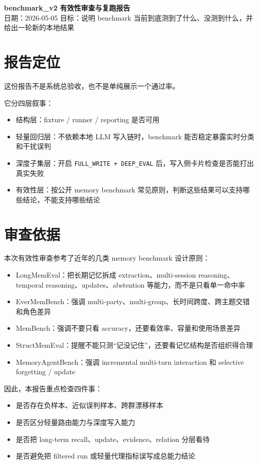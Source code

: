 \documentclass[11pt]{article}
\begin{document}
{\LARGE\bfseries benchmark\_v2 有效性审查与复跑报告}\\
{\small \color{textgray} 日期：2026-05-05 \quad 目标：说明 benchmark 当前到底测到了什么、没测到什么，并给出一轮新的本地结果}

\section{报告定位}

这份报告不是系统总验收，也不是单纯展示一个通过率。

它分四层叙事：
\begin{itemize}
\item 结构层：fixture / runner / reporting 是否可用
\item 轻量回归层：不依赖本地 LLM 写入链时，benchmark 能否稳定暴露实时分类和干扰误判
\item 深度子集层：开启 \texttt{FULL\_WRITE + DEEP\_EVAL} 后，写入侧卡片检查是否能打出真实失败
\item 有效性层：按公开 memory benchmark 常见原则，判断这些结果可以支持哪些结论，不能支持哪些结论
\end{itemize}

\section{审查依据}

本次有效性审查参考了近年的几类 memory benchmark 设计原则：
\begin{itemize}
\item LongMemEval：把长期记忆拆成 extraction、multi-session reasoning、temporal reasoning、updates、abstention 等能力，而不是只看单一命中率
\item EverMemBench：强调 multi-party、multi-group、长时间跨度、跨主题交错和角色差异
\item MemBench：强调不要只看 accuracy，还要看效率、容量和使用场景差异
\item StructMemEval：提醒不能只测“记没记住”，还要看记忆结构是否组织得合理
\item MemoryAgentBench：强调 incremental multi-turn interaction 和 selective forgetting / update
\end{itemize}

因此，本报告重点检查四件事：
\begin{itemize}
\item 是否存在负样本、近似误判样本、跨群漂移样本
\item 是否区分轻量路由能力与深度写入能力
\item 是否把 long-term recall、update、evidence、relation 分层看待
\item 是否避免把 filtered run 或轻量代理指标误写成总能力结论
\end{itemize}
\end{document}
